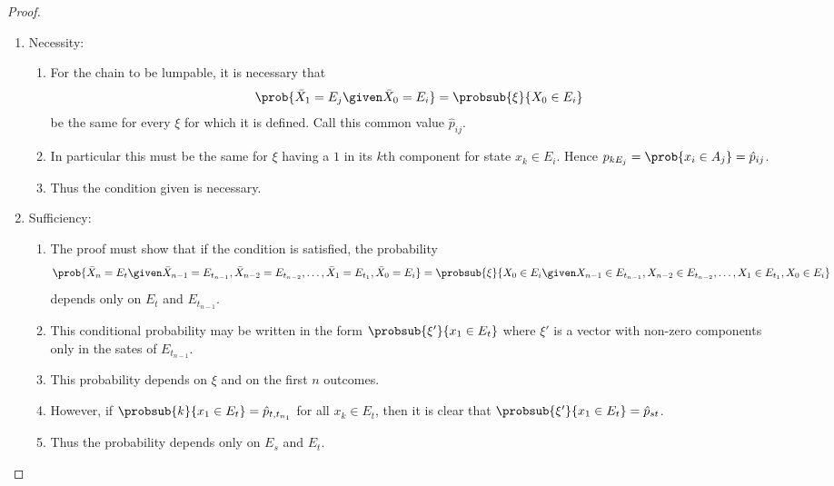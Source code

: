 \documentclass[12pt]{article}
\begin{document}
\begin{proof}
    \begin{enumerate}
        \item
            Necessity:
            \begin{enumerate}
                \item
                    For the chain to be lumpable, it is necessary that
                    \[
                        \prob{\bar{X}_1 = E_j \given \bar{X}_0 = E_i} =
                        \probsub{\xi}{X_0 \in E_i }
                    \] be the same for every \( \xi \) for which it is
                    defined.  Call this common value \( \hat{p}_{ij} \).
                \item
                    In particular this must be the same for \( \xi \)
                    having a \( 1 \) in its \( k \)th component for
                    state \( x_k \in E_i \). Hence \( p_{kE_j} = \prob{x_i
                    \in A_j} = \hat{p}_{ij} \).
                \item
                    Thus the condition given is necessary.
            \end{enumerate}
        \item
            Sufficiency:
            \begin{enumerate}
                \item
                    The proof must show that if the condition is
                    satisfied, the probability
                    \[
                        \prob{\bar{X}_n = E_t \given \bar{X}_{n-1} = E_{t_
                        {n-1}}, \bar{X}_{n-2} = E_{t_{n-2}}, \dots, \bar
                        {X}_1 = E_{t_1}, \bar{X}_0 = E_i} = \probsub{\xi}
                        {X_0 \in E_i \given X_{n-1} \in E_{t_{n-1}}, X_{n-2}
                        \in E_{t_{n-2}}, \dots, X_1 \in E_{t_1}, X_0 \in
                        E_i}
                    \] depends only on \( E_t \) and \( E_{t_{n-1}} \).
                \item
                    This conditional probability may be written in the
                    form \( \probsub{\xi'}{x_1 \in E_t} \) where \( \xi'
                    \) is a vector with non-zero components only in the
                    sates of \( E_{t_{n-1}} \).
                \item
                    This probability depends on \( \xi \) and on the
                    first \( n \) outcomes.
                \item
                    However, if \( \probsub{k}{x_1 \in E_t} = \hat{p}_{t,
                    t_{n_1}} \) for all \( x_k \in E_t \), then it is
                    clear that \( \probsub{\xi'}{x_1 \in E_t} = \hat{p}_
                    {st} \).
                \item
                    Thus the probability depends only on \( E_s \) and \(
                    E_t \).
            \end{enumerate}
    \end{enumerate}
\end{proof}
\end{document}
